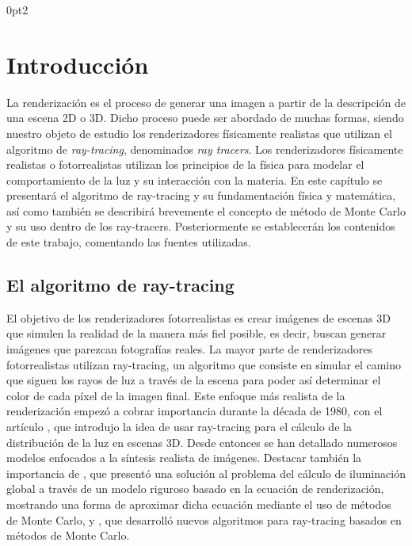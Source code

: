 \titlespacing*{\subsection}
  {0pt}{2\baselineskip}{\baselineskip}

\chapter{Introducción}

La renderización es el proceso de generar una imagen a partir de la descripción de una escena 2D o 3D. Dicho proceso puede ser abordado de muchas formas, siendo nuestro objeto de estudio los renderizadores físicamente realistas que utilizan el algoritmo de \emph{ray-tracing}, denominados \emph{ray tracers}. Los renderizadores físicamente realistas o fotorrealistas utilizan los principios de la física para modelar el comportamiento de la luz y su interacción con la materia. En este capítulo se presentará el algoritmo de ray-tracing y su fundamentación física y matemática, así como también se describirá brevemente el concepto de método de Monte Carlo y su uso dentro de los ray-tracers. Posteriormente se establecerán los contenidos de este trabajo, comentando las fuentes utilizadas.

\section{El algoritmo de ray-tracing}

El objetivo de los renderizadores fotorrealistas es crear imágenes de escenas 3D que simulen la realidad de la manera más fiel posible, es decir, buscan generar imágenes que parezcan fotografías reales. La mayor parte de renderizadores fotorrealistas utilizan ray-tracing, un algoritmo que consiste en simular el camino que siguen los rayos de luz a través de la escena para poder así determinar el color de cada píxel de la imagen final. Este enfoque más realista de la renderización empezó a cobrar importancia durante la década de 1980, con el artículo \cite{Whitted}, que introdujo la idea de usar ray-tracing para el cálculo de la distribución de la luz en escenas 3D. Desde entonces se han detallado numerosos modelos enfocados a la síntesis realista de imágenes. Destacar también la importancia de \cite{Kajiya86}, que presentó una solución al problema del cálculo de iluminación global a través de un modelo riguroso basado en la ecuación de renderización, mostrando una forma de aproximar dicha ecuación mediante el uso de métodos de Monte Carlo, y \cite{Veach97}, que desarrolló nuevos algoritmos para ray-tracing basados en métodos de Monte Carlo.

